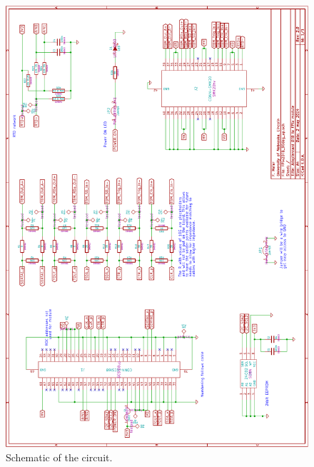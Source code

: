 \begin{figure}[hbtp]
	\begin{center}
	\includegraphics[width=1.0\textwidth]{img/FPix2DTB_90degSchematic.pdf}
	\end{center}
	\caption{Schematic of the circuit.}
	\label{fig:FPix2DTB_90degSchematic}
\end{figure}

